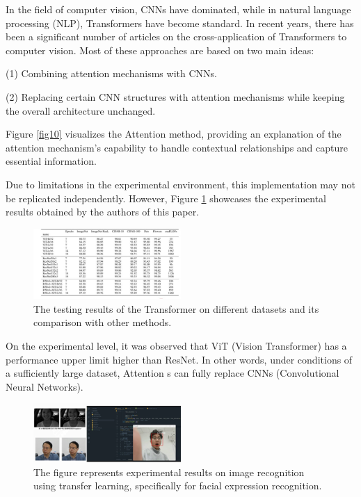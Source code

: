 \documentclass[10pt,twocolumn,letterpaper]{article}
\begin{document}
In the field of computer vision, CNNs have dominated, while in natural language processing (NLP), Transformers have become standard. In recent years, there has been a significant number of articles on the cross-application of Transformers to computer vision. Most of these approaches are based on two main ideas:

(1) Combining attention mechanisms with CNNs.

(2) Replacing certain CNN structures with attention mechanisms while keeping the overall architecture unchanged.

Figure \ref{fig10} visualizes the Attention method, providing an explanation of the attention mechanism's capability to handle contextual relationships and capture essential information.

Due to limitations in the experimental environment, this implementation\cite{dosovitskiy2020image} may not be replicated independently. However, Figure \ref{fig11} showcases the experimental results obtained by the authors of this paper.

\begin{figure}
  \centering %
  \includegraphics[width=0.5\textwidth]{image11.jpg} %
  \caption{The testing results of the Transformer on different datasets and its comparison with other methods.} %
  \label{fig11}
\end{figure}

On the experimental level, it was observed that ViT\cite{dosovitskiy2020image} (Vision Transformer) has a performance upper limit higher than ResNet. In other words, under conditions of a sufficiently large dataset, Attention s can fully replace CNNs (Convolutional Neural Networks).

\begin{figure}
  \centering %
  \includegraphics[width=0.5\textwidth]{image12.png} %
  \caption{The figure represents experimental results on image recognition using transfer learning, specifically for facial expression recognition.} %
  \label{fig12}
\end{figure}
\end{document}
